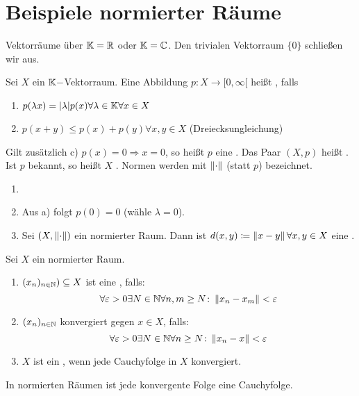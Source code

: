\chapter{Beispiele normierter R\"aume}
Vektorr\"aume \"uber $ \mathbb{K}=\mathbb{R} $ oder $ \mathbb{K}=\mathbb{C} $. Den trivialen Vektorraum $ \lbrace 0\rbrace $ schlie\ss en wir aus.
\begin{definition}
Sei $ X $ ein $ \mathbb{K}- $Vektorraum. Eine Abbildung $ p\colon X\longrightarrow[0,\infty[ $ hei\ss t , falls
\begin{enumerate}
\item[a)] $ p(\lambda x)=|\lambda|p(x)\forall\lambda\in\mathbb{K}\forall x\in X $
\item[b)] $ p(x+y)\leq p(x)+p(y)\forall x,y\in X $ (Dreiecksungleichung)
\end{enumerate}
Gilt zus\"atzlich c) $ p(x)=0\Rightarrow x=0 $, so hei\ss t $ p $ eine . Das Paar $ (X,p) $ hei\ss t .\\
Ist $ p $ bekannt, so hei\ss t $ X $ . Normen werden mit $ \left\|\cdot\right\| $ (statt $ p $) bezeichnet.
\end{definition}
\begin{bemerkung*}
\begin{enumerate}
\item[]
\item Aus a) folgt $ p(0)=0 $ (w\"ahle $ \lambda=0 $).
\item Sei $ (X,\left\|\cdot\right\|) $ ein normierter Raum. Dann ist $ d(x,y)\coloneqq\left\|x-y\right\|\forall x,y\in X $ eine .
\end{enumerate}
\end{bemerkung*}
\newpage
\begin{definition}
Sei $ X $ ein normierter Raum.
\begin{enumerate}
\item[a)] $ (x_n)_{n\in\mathbb{N}})\subseteq X $ ist eine , falls:
\[ \forall\varepsilon>0\exists N\in\mathbb{N}\forall n,m\geq N\colon\left\|x_n-x_m\right\|<\varepsilon \]
\item[b)] $ (x_n)_{n\in\mathbb{N}} $ konvergiert gegen $ x\in X $, falls:
\[ \forall\varepsilon>0\exists N\in\mathbb{N}\forall n\geq N\colon\left\|x_n-x\right\|<\varepsilon \]
\item[c)] $ X $ ist ein , wenn jede Cauchyfolge in $ X $ konvergiert.
\end{enumerate}
\end{definition}
\begin{bemerkung*}
In normierten R\"aumen ist jede konvergente Folge eine Cauchyfolge.
\end{bemerkung*}
